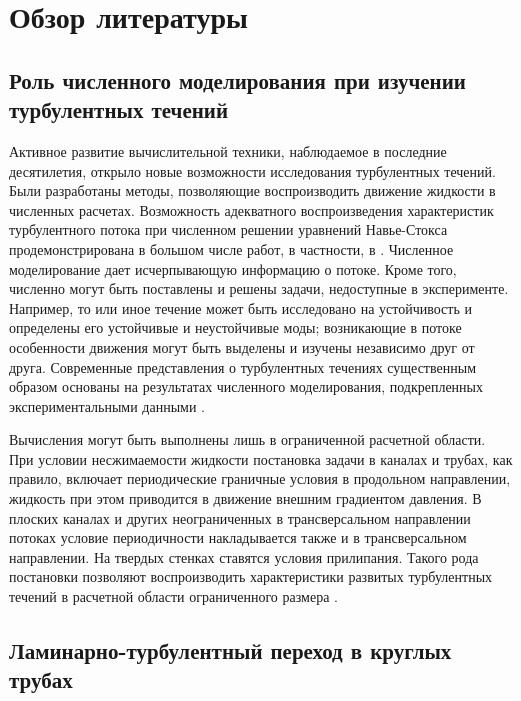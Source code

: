 \renewcommand \thechapter {ii}
\thispagestyle{empty}
\phantom{.}
\chapter*{Обзор литературы}
\setcounter{section}{0}
\section{Роль численного моделирования при изучении турбулентных течений}

Активное развитие вычислительной техники, наблюдаемое в последние десятилетия, открыло новые возможности исследования турбулентных течений. Были разработаны методы, позволяющие воспроизводить движение жидкости в численных расчетах. Возможность адекватного воспроизведения характеристик турбулентного потока при численном решении уравнений Навье-Стокса продемонстрирована в большом числе работ, в частности, в \cite{Kim1987, Priymak1998, Nikitin2006}. Численное моделирование дает исчерпывающую информацию о потоке. Кроме того, численно могут быть поставлены и решены задачи, недоступные в эксперименте. Например, то или иное течение может быть исследовано на устойчивость и определены его устойчивые и неустойчивые моды; возникающие в потоке особенности движения могут быть выделены и изучены независимо друг от друга. Современные представления о турбулентных течениях существенным образом основаны на результатах численного моделирования, подкрепленных экспериментальными данными \cite{Manneville2015, Manneville2016}.

Вычисления могут быть выполнены лишь в ограниченной расчетной области. При условии несжимаемости жидкости постановка задачи в каналах и трубах, как правило, включает периодические граничные условия в продольном направлении, жидкость при этом приводится в движение внешним градиентом давления. В плоских каналах и других неограниченных в трансверсальном направлении потоках условие периодичности накладывается также и в трансверсальном направлении. На твердых стенках ставятся условия прилипания. Такого рода постановки позволяют воспроизводить характеристики развитых турбулентных течений в расчетной области ограниченного размера \cite{Kim1987, Priymak1998, Nikitin2006}. 


\section{Ламинарно-турбулентный переход в круглых трубах}

